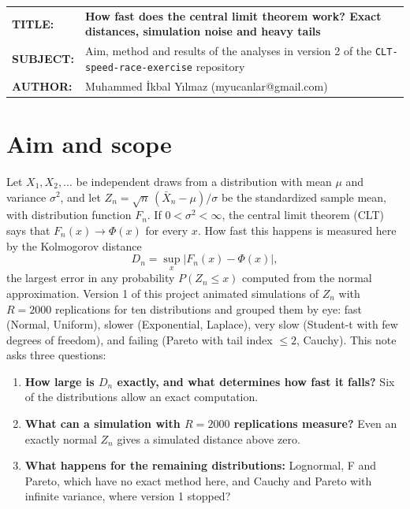 \documentclass[11pt,a4paper]{article}
\begin{document}
\vspace*{14pt}
\begin{tabular}{@{}p{2.35cm}@{}p{\dimexpr\textwidth-2.35cm}@{}}
\textbf{TITLE:} & \textbf{\large How fast does the central limit theorem work? Exact distances, simulation noise and heavy tails}\\[3pt]
\textbf{SUBJECT:} & Aim, method and results of the analyses in version 2 of the \texttt{CLT-speed-race-exercise} repository\\[3pt]
\textbf{AUTHOR:} & Muhammed İkbal Yılmaz (myucanlar@gmail.com)
\end{tabular}

\vspace{8pt}
\vspace{12pt}

\section{Aim and scope}

Let $X_1, X_2, \dots$ be independent draws from a distribution with mean $\mu$ and variance $\sigma^2$, and let
$Z_n = \sqrt n\,(\bar X_n - \mu)/\sigma$ be the standardized sample mean, with distribution function $F_n$. If
$0 < \sigma^2 < \infty$, the central limit theorem (CLT) says that $F_n(x) \to \Phi(x)$ for every $x$. How fast this happens is
measured here by the Kolmogorov distance
\[
D_n = \sup_x \lvert F_n(x) - \Phi(x)\rvert ,
\]
the largest error in any probability $P(Z_n \le x)$ computed from the normal approximation. Version 1 of this project animated
simulations of $Z_n$ with $R = 2000$ replications for ten distributions and grouped them by eye: fast (Normal, Uniform), slower
(Exponential, Laplace), very slow (Student-t with few degrees of freedom), and failing (Pareto with tail index $\le 2$, Cauchy).
This note asks three questions:

\begin{enumerate}
  \item \textbf{How large is $D_n$ exactly, and what determines how fast it falls?} Six of the distributions allow an exact
  computation.
  \item \textbf{What can a simulation with $R = 2000$ replications measure?} Even an exactly normal $Z_n$ gives a simulated
  distance above zero.
  \item \textbf{What happens for the remaining distributions:} Lognormal, F and Pareto, which have no exact method here, and
  Cauchy and Pareto with infinite variance, where version 1 stopped?
\end{enumerate}
\end{document}

